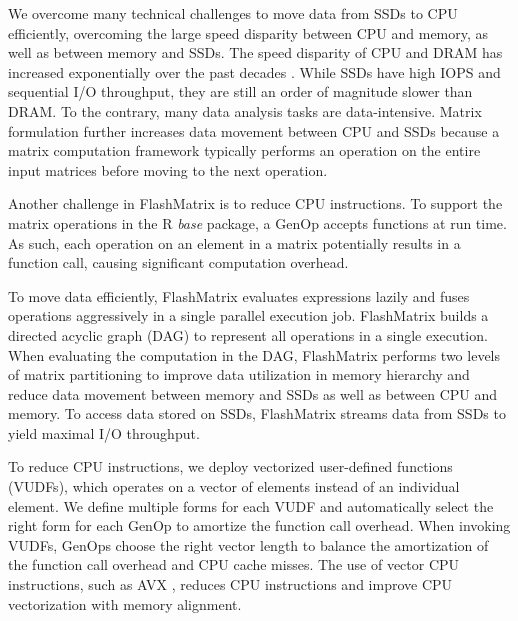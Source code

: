 

We overcome many technical challenges to move data from SSDs to CPU efficiently,
overcoming the large speed disparity between CPU and memory, as well as between
memory and
SSDs. The speed disparity of CPU and DRAM has increased exponentially over
the past decades \cite{Wilkes01}. While SSDs have high IOPS and sequential
I/O throughput, they are still an order of magnitude slower than DRAM.
To the contrary, many data analysis tasks are data-intensive. Matrix
formulation further increases data movement between CPU and SSDs because
a matrix computation framework typically performs an operation
on the entire input matrices before moving to the next operation.

Another challenge in FlashMatrix is to reduce CPU instructions. To support
the matrix operations in the R
\textit{base} package, a GenOp accepts functions at run time.
As such, each operation on an element in a matrix potentially results in
a function call, causing significant computation overhead.

To move data efficiently, FlashMatrix evaluates expressions lazily and fuses
operations aggressively in a single parallel execution job.
FlashMatrix builds a directed acyclic graph (DAG) to represent all operations
in a single execution. When evaluating the computation in the DAG, FlashMatrix
performs two levels of matrix partitioning to improve data utilization in
memory hierarchy and reduce data movement between memory and SSDs
as well as between CPU and memory. To access data stored on SSDs, FlashMatrix
streams data from SSDs to yield maximal I/O throughput.


To reduce CPU instructions, we deploy vectorized user-defined
functions (VUDFs), which operates on a vector of elements instead of
an individual element. We define multiple forms for each VUDF and automatically
select the right form for each GenOp to amortize the function call overhead.
When invoking VUDFs, GenOps choose the right vector length to balance
the amortization of the function call overhead and CPU cache misses. The use
of vector CPU instructions, such as AVX \cite{avx}, reduces CPU
instructions and improve CPU vectorization with memory alignment.

